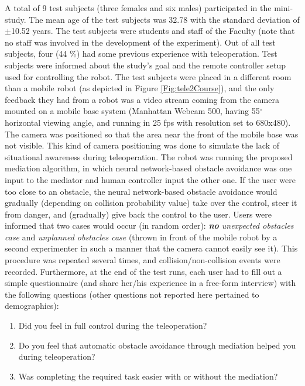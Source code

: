 A total of 9 test subjects (three females and six males) participated in the mini-study. The mean age of the test subjects was 32.78 with the standard deviation of $\pm$10.52 years. The test subjects were students and staff of the Faculty (note that no staff was involved in the development of the experiment). Out of all test subjects, four (44 \%) had some previous experience with teleoperation.
Test subjects were informed about the study's goal and the remote controller setup used for controlling the robot. The test subjects were placed in a different room than a mobile robot (as depicted in Figure \ref{Fig:tele2Course}), and the only feedback they had from a robot was a video stream coming from the camera mounted on a mobile base system (Manhattan Webcam 500, having 55$^{\circ}$ horizontal viewing angle, and running in 25 fps with resolution set to 680x480). The camera was positioned so that the area near the front of the mobile base was not visible. This kind of camera positioning was done to simulate the lack of situational awareness during teleoperation. The robot was running the proposed mediation algorithm, in which neural network-based obstacle avoidance was one input to the mediator and human controller input the other one. If the user were too close to an obstacle, the neural network-based obstacle avoidance would gradually (depending on collision probability value) take over the control, steer it from danger, and (gradually) give back the control to the user. Users were informed that two cases would occur (in random order): \emph{\textbf{no} unexpected obstacles case} and \emph{unplanned obstacles case} (thrown in front of the mobile robot by a second experimenter in such a manner that the camera cannot easily see it). This procedure was repeated several times, and collision/non-collision events were recorded. Furthermore, at the end of the test runs, each user had to fill out a simple questionnaire (and share her/his experience in a free-form interview) with the following questions (other questions not reported here pertained to demographics):

\begin{enumerate}
\item Did you feel in full control during the teleoperation?
\item Do you feel that automatic obstacle avoidance through mediation helped you during teleoperation?
\item Was completing the required task easier with or without the mediation?
\end{enumerate}

